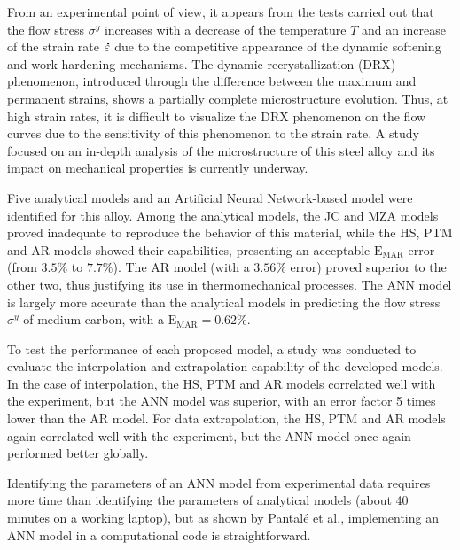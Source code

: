 \documentclass[metals,article,submit,pdftex,moreauthors]{Definitions/mdpi}
\makeatletter
\DeclareRobustCommand{\mdot}[1]{\accentset{\mbox{\bfseries .}}{#1}}
\DeclareRobustCommand{\eal}{et al.\@\xspace}
\DeclareRobustCommand{\MARE}{\text{E}_\text{MAR}}
\makeatother
\begin{document}
From an experimental point of view, it appears from the tests carried out that the flow stress $\sigma^y$ increases with a decrease of the temperature $T$ and an increase of the strain rate $\mdot\varepsilon$ due to the competitive appearance of the dynamic softening and work hardening mechanisms.
The dynamic recrystallization (DRX) phenomenon, introduced through the difference between the maximum and permanent strains, shows a partially complete microstructure evolution.
Thus, at high strain rates, it is difficult to visualize the DRX phenomenon on the flow curves due to the sensitivity of this phenomenon to the strain rate.
A study focused on an in-depth analysis of the microstructure of this steel alloy and its impact on mechanical properties is currently underway.

Five analytical models and an Artificial Neural Network-based model were identified for this alloy.
Among the analytical models, the JC and MZA models proved inadequate to reproduce the behavior of this material, while the HS, PTM and AR models showed their capabilities, presenting an acceptable $\MARE$ error (from $3.5\%$ to $7.7\%$).
The AR model (with a $3.56\%$ error) proved superior to the other two, thus justifying its use in thermomechanical processes.
The ANN model is largely more accurate than the analytical models in predicting the flow stress $\sigma^y$ of medium carbon, with a $\MARE=0.62\%$.

To test the performance of each proposed model, a study was conducted to evaluate the interpolation and extrapolation capability of the developed models.
In the case of interpolation, the HS, PTM and AR models correlated well with the experiment, but the ANN model was superior, with an error factor 5 times lower than the AR model.
For data extrapolation, the HS, PTM and AR models again correlated well with the experiment, but the ANN model once again performed better globally.

Identifying the parameters of an ANN model from experimental data requires more time than identifying the parameters of analytical models (about 40 minutes on a working laptop), but as shown by Pantalé \eal \cite{Pantale-2021, Pantale-2023}, implementing an ANN model in a computational code is straightforward.

\vspace{6pt} 

\end{document}
